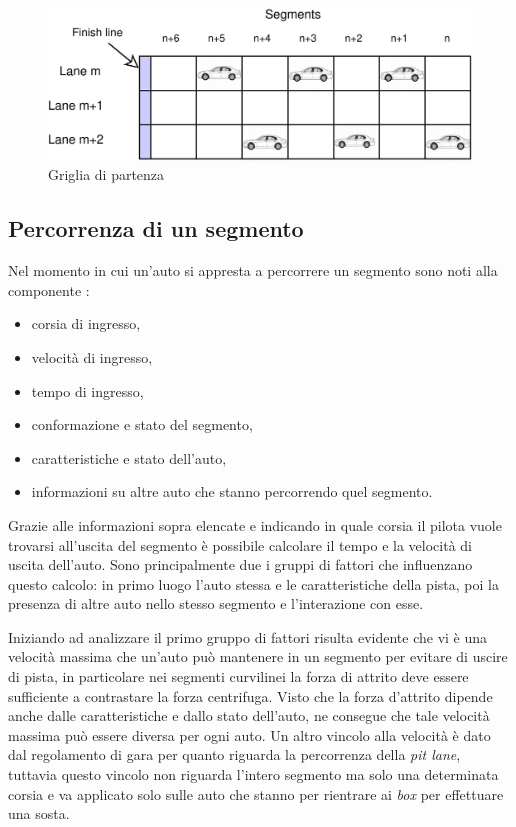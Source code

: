 \begin{figure}
\includegraphics[width=\textwidth]{diagrammi/StartGrid}
\caption{Griglia di partenza}
\label{fig:startGrid}
\end{figure}

\subsection{Percorrenza di un segmento}
\label{sec:percorrenza}
Nel momento in cui un'auto si appresta a percorrere un segmento sono noti alla componente :
\begin{itemize}
\item corsia di ingresso,
\item velocità di ingresso,
\item tempo di ingresso,
\item conformazione e stato del segmento,
\item caratteristiche e stato dell'auto,
\item informazioni su altre auto che stanno percorrendo quel segmento.
\end{itemize}

Grazie alle informazioni sopra elencate e indicando in quale corsia il pilota vuole trovarsi all'uscita del segmento è possibile calcolare il tempo e la velocità di uscita dell'auto. Sono principalmente due i gruppi di fattori che influenzano questo calcolo: in primo luogo l'auto stessa e le caratteristiche della pista, poi la presenza di altre auto nello stesso segmento e l'interazione con esse.

Iniziando ad analizzare il primo gruppo di fattori risulta evidente che vi è una velocità massima che un'auto può mantenere in un segmento per evitare di uscire di pista, in particolare nei segmenti curvilinei la forza di attrito deve essere sufficiente a contrastare la forza centrifuga.
Visto che la forza d'attrito dipende anche dalle caratteristiche e dallo stato dell'auto, ne consegue che tale velocità massima può essere diversa per ogni auto.
Un altro vincolo alla velocità è dato dal regolamento di gara per quanto riguarda la percorrenza della \textit{pit lane}, tuttavia questo vincolo non riguarda l'intero segmento ma solo una determinata corsia e va applicato solo sulle auto che stanno per rientrare ai \textit{box} per effettuare una sosta.

